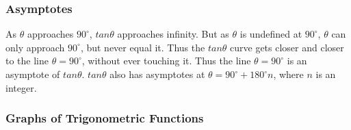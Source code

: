           
        
        \label{m39414*uid89}
            \subsubsection{ Asymptotes}
            \nopagebreak
            
          
          \label{m39414*id91637}As \begin{math}\theta \end{math} approaches \begin{math}{90}^{\circ }\end{math}, \begin{math}tan\theta \end{math} approaches infinity. But as \begin{math}\theta \end{math} is undefined at \begin{math}{90}^{\circ }\end{math}, \begin{math}\theta \end{math} can only approach \begin{math}{90}^{\circ }\end{math}, but never equal it. Thus the \begin{math}tan\theta \end{math} curve gets closer and closer to the line \begin{math}\theta ={90}^{\circ }\end{math}, without ever touching it. Thus the line \begin{math}\theta ={90}^{\circ }\end{math} is an asymptote of \begin{math}tan\theta \end{math}. \begin{math}tan\theta \end{math} also has asymptotes at \begin{math}\theta ={90}^{\circ }+{180}^{\circ }n\end{math}, where \begin{math}n\end{math} is an integer.\par 
\label{m39414*secfhsst!!!underscore!!!id3393}
            \subsubsection{  Graphs of Trigonometric Functions }
            \nopagebreak
            
